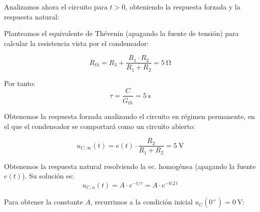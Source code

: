 \begin{enumerate}
  Analizamos ahora el circuito para $t > 0$, obteniendo la respuesta forzada y la respuesta natural:


  \begin{minipage}{0.5\linewidth}
    Planteamos el equivalente de Thévenin (apagando la fuente de tensión) para calcular la resistencia vista por el condensador:

  \[
    R_{th} = R_3 + \frac{R_1 \cdot R_2}{R_1 + R_2} = \qty{5}{\ohm}
  \]

  Por tanto:
  \begin{equation*}
    \tau = \frac{C}{G_{th}} = \qty{5}{\second}
  \end{equation*}
\end{minipage}
\begin{minipage}{0.5\linewidth}
\end{minipage}

Obtenemos la respuesta forzada analizando el circuito en régimen
permanente, en el que el condensador se comportará como un circuito
abierto:

\begin{equation*}
  u_{C,\infty}(t) = e(t) \cdot \frac{R_2}{R_1 + R_2} = \qty{5}{\volt}
\end{equation*}

Obtenemos la respuesta natural resolviendo la ec. homogénea (apagando la fuente $e(t)$). Su solución es:
\begin{equation*}
  u_{C,n}(t) = A \cdot e^{-t/\tau} = A \cdot e^{-0.2\, t}
\end{equation*}

Para obtener la constante $A$, recurrimos a la condición inicial
$u_C(0^+) = \qty{0}{\volt}$:


\end{enumerate}
